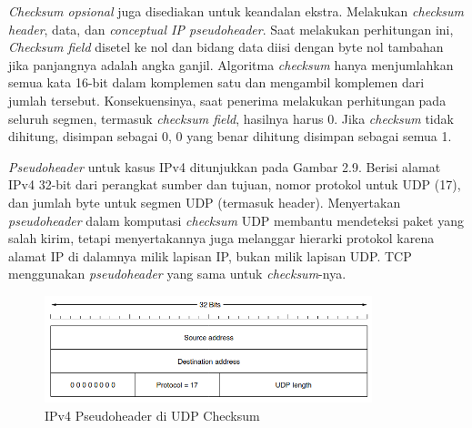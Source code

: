 \emph{Checksum opsional} juga disediakan untuk keandalan ekstra. Melakukan \emph{checksum  header}, data, dan \emph{conceptual IP pseudoheader}. Saat melakukan perhitungan ini, \emph{Checksum field} disetel ke nol dan bidang data diisi dengan byte nol tambahan jika panjangnya adalah angka ganjil. Algoritma \emph{checksum} hanya menjumlahkan semua kata 16-bit dalam komplemen satu dan mengambil komplemen dari jumlah tersebut. Konsekuensinya, saat penerima melakukan perhitungan pada seluruh segmen, termasuk \emph{checksum field}, hasilnya harus 0. Jika \emph{checksum} tidak dihitung, disimpan sebagai 0, 0 yang benar dihitung disimpan sebagai semua 1.

\emph{Pseudoheader} untuk kasus IPv4 ditunjukkan pada Gambar 2.9. Berisi alamat IPv4 32-bit dari perangkat sumber dan tujuan, nomor protokol untuk UDP (17), dan jumlah byte untuk segmen UDP (termasuk header). Menyertakan \emph{pseudoheader} dalam komputasi \emph{checksum} UDP membantu mendeteksi paket yang salah kirim, tetapi menyertakannya juga melanggar hierarki protokol karena alamat IP di dalamnya milik lapisan IP, bukan milik lapisan UDP. TCP menggunakan \emph{pseudoheader} yang sama untuk \emph{checksum}-nya.

\begin{figure}[H]
  \centering{}
	\includegraphics[width=0.85\textwidth]{gambar/the_IPv4_pseudoheader_included_in_the_UDP_checksum}
  \caption{IPv4 Pseudoheader di UDP Checksum}
\end{figure}


